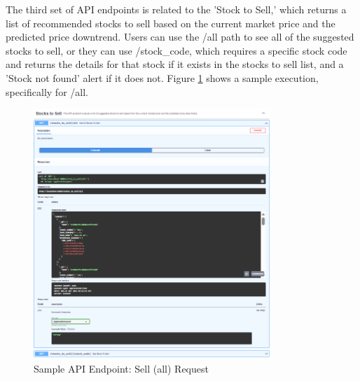 The third set of API endpoints is related to the 'Stock to Sell,' which returns 
a list of recommended stocks to sell based on the current market price and 
the predicted price downtrend. Users can use the /all path to see all of 
the suggested stocks to sell, or they can use /stock\_code, which requires a 
specific stock code and returns the details for that stock if it exists in the 
stocks to sell list, and a 'Stock not found' alert if it does not. Figure 
\ref{fig:alamAPI_sell} shows a sample execution, specifically for /all.
\begin{figure}[ht]
    \centering
    \includegraphics[width=0.80\textwidth]{./assets/Chapter_4/Documentation/alamAPI_sell.png}
    \caption{Sample API Endpoint: Sell (all) Request}
    \label{fig:alamAPI_sell}
\end{figure}
\FloatBarrier

